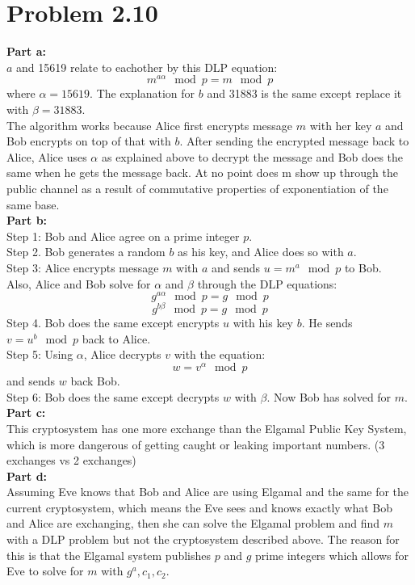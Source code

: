 \documentclass[10pt]{amsart}
\begin{document}
\section*{\large \textbf{Problem 2.10}}

\begin{addmargin}{5pt}
\noindent \textbf{\large Part a:} \\
$a$ and 15619 relate to eachother by this DLP equation:
\[m^{a\alpha} \mod p = m \mod p\] 
where $\alpha = 15619$. 
The explanation for $b$ and 31883 is the same except replace it with 
$\beta = 31883$. \\

The algorithm works because Alice first encrypts message $m$ with her key $a$
and Bob encrypts on top of that with $b$. After sending the encrypted message 
back to Alice, Alice uses $\alpha$ as explained above to decrypt the message
and Bob does the same when he gets the message back. At no point does m
show up through the public channel as a result of commutative properties of 
exponentiation of the same base. \\

\noindent \textbf{\large Part b:} \\
Step 1: Bob and Alice agree on a prime integer $p$. \\
Step 2. Bob generates a random $b$ as his key, and Alice does so with $a$. \\
Step 3: Alice encrypts message $m$ with $a$ and sends $u = m^a \mod p$ to Bob.\\ 
Also, Alice and Bob solve for $\alpha$ and $\beta$ through the DLP equations:
\[g^{a\alpha} \mod p = g \mod p\]
\[g^{b\beta} \mod p = g \mod p\]
Step 4. Bob does the same except encrypts $u$ with his key $b$. He sends 
$v = u^b \mod p$ back to Alice. \\
Step 5: Using $\alpha$, Alice decrypts $v$ with the equation: 
\[w = v^{\alpha} \mod p\]
and sends $w$ back Bob. \\
Step 6: Bob does the same except decrypts $w$ with $\beta$. Now Bob has solved 
for $m$. \\

\noindent \textbf{\large Part c:} \\
This cryptosystem has one more exchange than the Elgamal Public Key System, 
which is more dangerous of getting caught or leaking important numbers. 
(3 exchanges vs 2 exchanges) \\

\noindent \textbf{\large Part d:} \\
Assuming Eve knows that Bob and Alice are using Elgamal and the same for the 
current cryptosystem, which means the Eve sees and knows exactly what Bob and 
Alice are exchanging, then she can solve the Elgamal problem and find $m$ with 
a DLP problem but not the cryptosystem described above. The reason for this is 
that the Elgamal system publishes $p$ and $g$ prime integers which allows for 
Eve to solve for $m$ with $g^a, c_{1}, c_{2}$. \\


\end{addmargin}
\end{document}
